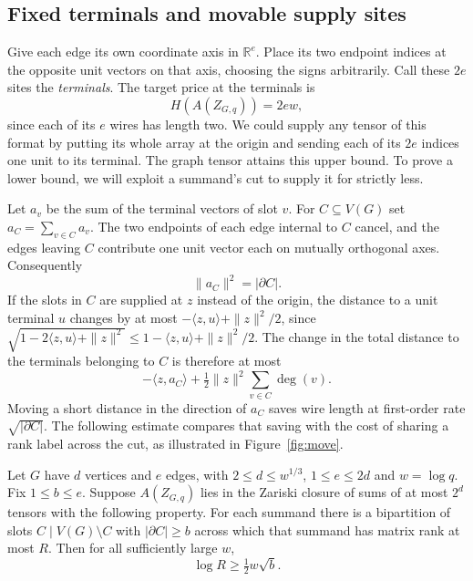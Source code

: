 \subsection*{Fixed terminals and movable supply sites}

Give each edge its own coordinate axis in $\mathbb R^e$. Place its
two endpoint indices at the opposite unit vectors on that axis, choosing
the signs arbitrarily. Call these $2e$ sites the \emph{terminals}.
The target price at the terminals is
\[
                          H(A(Z_{G,q}))=2ew ,
\]
since each of its $e$ wires has length two. We could supply any tensor
of this format by putting its whole array at the origin and sending
each of its $2e$ indices one unit to its terminal. The graph tensor
attains this upper bound. To prove a lower bound, we will exploit a
summand's cut to supply it for strictly less.

Let $a_v$ be the sum of the terminal vectors of slot $v$. For
$C\subseteq V(G)$ set $a_C=\sum_{v\in C}a_v$. The two endpoints of
each edge internal to $C$ cancel, and the edges leaving $C$ contribute
one unit vector each on mutually orthogonal axes. Consequently
\begin{equation}\label{eq:cut}
                       \|a_C\|^2=|\partial C|.
\end{equation}
If the slots in $C$ are supplied at $z$ instead of the origin, the
distance to a unit terminal $u$ changes by at most
$-\langle z,u\rangle+\|z\|^2/2$, since
$\sqrt{1-2\langle z,u\rangle+\|z\|^2}
 \le 1-\langle z,u\rangle+\|z\|^2/2$. The change in the total
distance to the terminals belonging to $C$ is therefore at most
\begin{equation}\label{eq:move}
                -\langle z,a_C\rangle+
                    \tfrac12\|z\|^2\sum_{v\in C}\deg(v).
\end{equation}
Moving a short distance in the direction of $a_C$ saves wire length at
first-order rate $\sqrt{|\partial C|}$. The following estimate
compares that saving with the cost of sharing a rank label across the
cut, as illustrated in Figure~\ref{fig:move}.


\begin{lemma}\label{lem:single}
Let $G$ have $d$ vertices and $e$ edges, with
$2\le d\le w^{1/3}$, $1\le e\le 2d$ and $w=\log q$.
Fix $1\le b\le e$. Suppose $A(Z_{G,q})$ lies in the Zariski closure
of sums of at most $2^d$ tensors with the following property. For each
summand there is a bipartition of slots $C\mid V(G)\setminus C$ with
$|\partial C|\ge b$ across which that summand has matrix rank at most
$R$. Then for all sufficiently large $w$,
\[
                             \log R\ge \tfrac12 w\sqrt b .
\]
\end{lemma}

